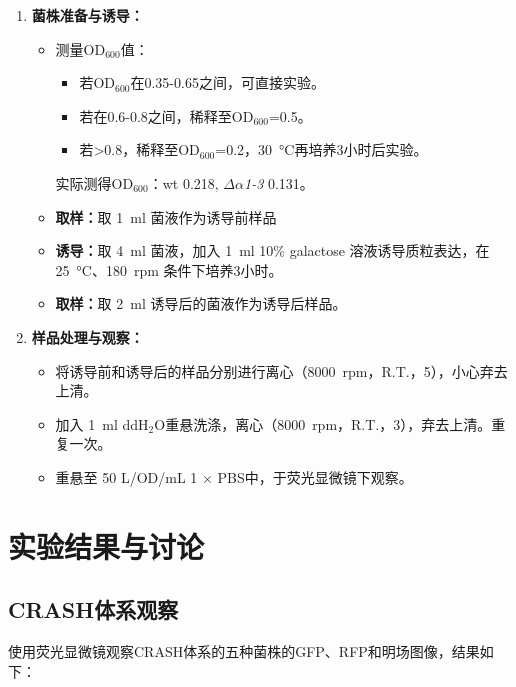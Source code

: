 \documentclass[a4,10pt]{article}
\begin{document}
\begin{enumerate}
    \item \textbf{菌株准备与诱导：}
    \begin{itemize}
        \item 测量OD$_{600}$值：
        \begin{itemize}
            \item 若OD$_{600}$在0.35-0.65之间，可直接实验。
            \item 若在0.6-0.8之间，稀释至OD$_{600}$=0.5。
            \item 若>0.8，稀释至OD$_{600}$=0.2，\qty{30}{\celsius}再培养3小时后实验。
        \end{itemize}
        实际测得OD$_{600}$：wt 0.218, $\Delta \alpha$\textit{1-3} 0.131。
        \item \textbf{取样：}取 \qty{1}{\ml} 菌液作为诱导前样品
        \item \textbf{诱导：}取 \qty{4}{\ml} 菌液，加入 \qty{1}{\ml} 10\% galactose 溶液诱导质粒表达，在 \qty{25}{\celsius}、\qty{180}{rpm} 条件下培养3小时。
        \item \textbf{取样：}取 \qty{2}{\ml} 诱导后的菌液作为诱导后样品。
    \end{itemize}
    
    \item \textbf{样品处理与观察：}
    \begin{itemize}
        \item 将诱导前和诱导后的样品分别进行离心（\qty{8000}{rpm}，R.T.，\qty{5}{\min}），小心弃去上清。
        \item 加入 \qty{1}{\ml} ddH$_2$O重悬洗涤，离心（\qty{8000}{rpm}，R.T.，\qty{3}{\min}），弃去上清。重复一次。
        \item 重悬至 50 \textmu L/OD/mL 1 $\times$ PBS中，于荧光显微镜下观察。
    \end{itemize}
\end{enumerate}

\section{实验结果与讨论}

\subsection{CRASH体系观察}
使用荧光显微镜观察CRASH体系的五种菌株的GFP、RFP和明场图像，结果如下：
\end{document}
